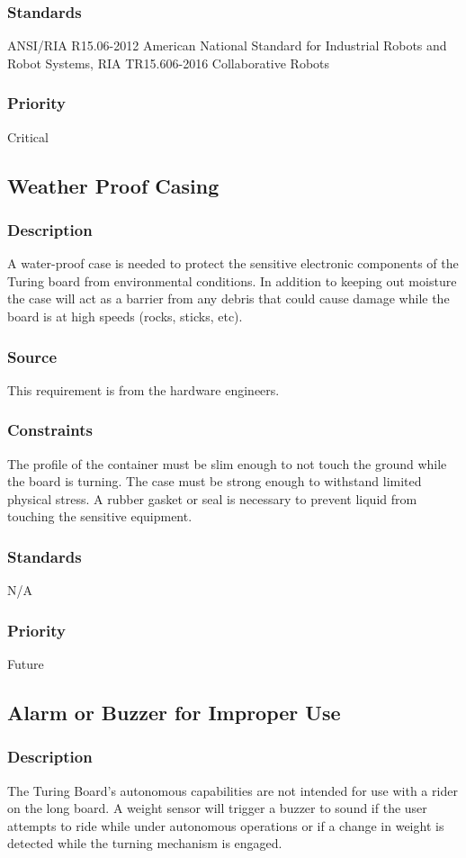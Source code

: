 \subsubsection{Standards}
ANSI/RIA R15.06-2012 American National Standard for Industrial Robots and Robot Systems, RIA TR15.606-2016 Collaborative Robots
\subsubsection{Priority}
Critical

\subsection{Weather Proof Casing}
\subsubsection{Description}
A water-proof case is needed to protect the sensitive electronic components of the Turing board from environmental conditions. In addition to keeping out moisture the case will act as a barrier from any debris that could cause damage while the board is at high speeds (rocks, sticks, etc).
\subsubsection{Source}
This requirement is from the hardware engineers.
\subsubsection{Constraints}
The profile of the container must be slim enough to not touch the ground while the board is turning. The case must be strong enough to withstand limited physical stress. A rubber gasket or seal is necessary to prevent liquid from touching the sensitive equipment.
\subsubsection{Standards}
N/A
\subsubsection{Priority}
Future

\subsection{Alarm or Buzzer for Improper Use}
\subsubsection{Description}
The Turing Board's autonomous capabilities are not intended for use with a rider on the long board. A weight sensor will trigger a buzzer to sound if the user attempts to ride while under autonomous operations or if a change in weight is detected while the turning mechanism is engaged.
